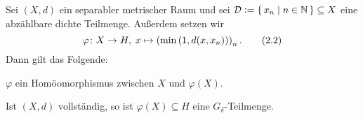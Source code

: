 \documentclass[../main/main.tex]{subfiles}
\begin{document}
	\begin{Hilfssatz}
		\label{lem:characterizationpolishspaces}
		Sei $(X, d)$ ein separabler metrischer Raum und sei 
		$\mathcal{D} \vcentcolon = \left\{\, x_n \; \middle| \; n \in \mathbb{N} \,\right\} \subseteq X$ eine abzählbare 
		dichte Teilmenge. Außerdem setzen wir
		\[\varphi \colon X \to H, \; x \mapsto \left(\min \left(1, d(x, x_n) \right) \right)_n  \text{.} \label{eq:2.2} \tag{2.2}\]
		Dann gilt das Folgende:
		\begin{enumeratethm}
			\item $\varphi$ ein Homöomorphismus zwischen $X$ und $\varphi(X)$.
			\item Ist $(X, d)$ vollständig, so ist $\varphi(X) \subseteq H$ 
			eine $G_\delta$-Teilmenge.
		\end{enumeratethm}
	\end{Hilfssatz}
	
\end{document}
